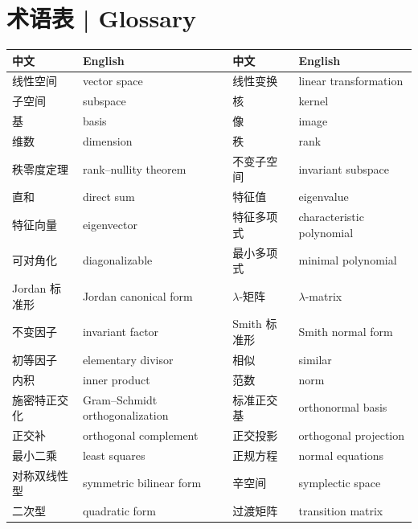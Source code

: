 \documentclass[UTF8,11pt,a4paper]{ctexart}
\renewcommand{\arraystretch}{1.08}
\begin{document}
\section*{术语表 | Glossary}
\footnotesize
\renewcommand{\arraystretch}{1.0}
\begin{center}
\begin{tabular}{p{3.1cm}p{4.7cm}p{3.1cm}p{4.7cm}}
\toprule
中文 & English & 中文 & English\\
\midrule
线性空间 & vector space & 线性变换 & linear transformation\\
子空间 & subspace & 核 & kernel\\
基 & basis & 像 & image\\
维数 & dimension & 秩 & rank\\
秩零度定理 & rank--nullity theorem & 不变子空间 & invariant subspace\\
直和 & direct sum & 特征值 & eigenvalue\\
特征向量 & eigenvector & 特征多项式 & characteristic polynomial\\
可对角化 & diagonalizable & 最小多项式 & minimal polynomial\\
Jordan 标准形 & Jordan canonical form & $\lambda$-矩阵 & $\lambda$-matrix\\
不变因子 & invariant factor & Smith 标准形 & Smith normal form\\
初等因子 & elementary divisor & 相似 & similar\\
内积 & inner product & 范数 & norm\\
施密特正交化 & Gram--Schmidt orthogonalization & 标准正交基 & orthonormal basis\\
正交补 & orthogonal complement & 正交投影 & orthogonal projection\\
最小二乘 & least squares & 正规方程 & normal equations\\
对称双线性型 & symmetric bilinear form & 辛空间 & symplectic space\\
二次型 & quadratic form & 过渡矩阵 & transition matrix\\
\bottomrule
\end{tabular}
\end{center}
\normalsize
\end{document}
